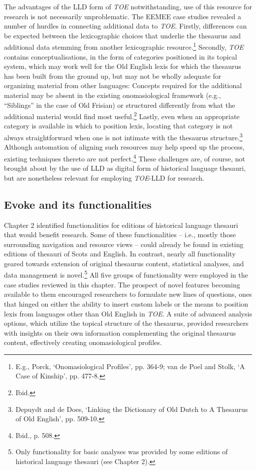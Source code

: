 The advantages of the LLD form of \textit{TOE} notwithstanding, use of this resource for research is not necessarily unproblematic. The EEMEE case studies revealed a number of hurdles in connecting additional data to \textit{TOE}. Firstly, differences can be expected between the lexicographic choices that underlie the thesaurus and additional data stemming from another lexicographic resource.\footnote{E.g., Porck, `Onomasiological Profiles', pp. 364-9; van de Poel and Stolk, `A Case of Kinship', pp. 477-8.} Secondly, \textit{TOE} contains conceptualisations, in the form of categories positioned in its topical system, which may work well for the Old English lexis for which the thesaurus has been built from the ground up, but may not be wholly adequate for organizing material from other languages: Concepts required for the additional material may be absent in the existing onomasiological framework (e.g., ``Siblings'' in the case of Old Frisian) or structured differently from what the additional material would find most useful.\footnote{Ibid.} Lastly, even when an appropriate category is available in which to position lexis, locating that category is not always straightforward when one is not intimate with the thesaurus structure.\footnote{Depuydt and de Does, ‘Linking the Dictionary of Old Dutch to A Thesaurus of Old English’, pp. 509-10.} Although automation of aligning such resources may help speed up the process, existing techniques thereto are not perfect.\footnote{Ibid., p. 508.} These challenges are, of course, not brought about by the use of LLD as digital form of historical language thesauri, but are nonetheless relevant for employing \textit{TOE}-LLD for research.%





\subsection{Evoke and its functionalities}

Chapter 2 identified functionalities for editions of historical language thesauri that would benefit research. Some of these functionalities -- i.e., mostly those surrounding navigation and resource views -- could already be found in existing editions of thesauri of Scots and English. In contrast, nearly all functionality geared towards extension of original thesaurus content, statistical analyses, and data management is novel.\footnote{Only functionality for basic analyses was provided by some editions of historical language thesauri (see Chapter 2).} All five groups of functionality were employed in the case studies reviewed in this chapter. The prospect of novel features becoming available to them encouraged researchers to formulate new lines of questions, ones that hinged on either the ability to insert custom labels or the means to position lexis from languages other than Old English in \textit{TOE}. A suite of advanced analysis options, which utilize the topical structure of the thesaurus, provided researchers with insights on their own information complementing the original thesaurus content, effectively creating onomasiological profiles.


